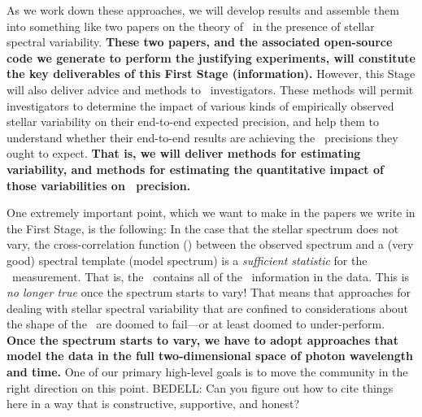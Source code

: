 \documentclass[12pt, letterpaper]{article}
\begin{document}
\noindent
As we work down these approaches, we will develop results and assemble them
into something like two papers on the theory of \EPRV\ in the presence of
stellar spectral variability. \textbf{These two papers, and the associated open-source
code we generate to perform the justifying experiments, will constitute the
key deliverables of this First Stage (information).}
However, this Stage will also deliver advice and methods to
\EPRV\ investigators.
These methods will permit investigators to determine the impact of
various kinds of empirically observed stellar variability on their
end-to-end expected precision,
and help them to understand whether their end-to-end results are
achieving the \RV\ precisions they ought to expect.
\textbf{That is, we will deliver methods for estimating variability, and methods
for estimating the quantitative impact of those variabilities on \RV\ precision.}

One extremely important point, which we want to make in the papers we write
in the First Stage, is the following:
In the case that the stellar spectrum does not vary, the
cross-correlation function (\CCF) between the observed spectrum and a
(very good) spectral template (model spectrum) is a \emph{sufficient
  statistic} for the \RV\ measurement.
That is, the \CCF\ contains all of the \RV\ information in the data.
This is \emph{no longer true} once the spectrum starts to vary!
That means that approaches for dealing with stellar spectral variability
that are confined to considerations about the shape of the \CCF\ are
doomed to fail---or at least doomed to under-perform.
\textbf{Once the spectrum starts to vary, we have to adopt approaches that model
the data in the full two-dimensional space of photon wavelength and time.}
One of our primary high-level goals is to move the community in the
right direction on this point.
BEDELL: Can you figure out how to cite things here in a way that is constructive,
supportive, and honest?

\end{document}
